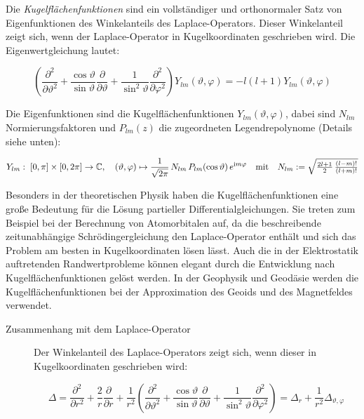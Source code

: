 \begin{definition}
Die \emph{Kugelflächenfunktionen} sind ein vollständiger und orthonormaler Satz von Eigenfunktionen des Winkelanteils des Laplace-Operators. Dieser Winkelanteil zeigt sich, wenn der Laplace-Operator in Kugelkoordinaten geschrieben wird. Die Eigenwertgleichung lautet:

\[\left(\frac{\partial^{2}}{\partial\vartheta^{2}}+\frac{\cos\vartheta}{\sin\vartheta}\frac{\partial}{\partial\vartheta}+\frac{1}{\sin^{2}\vartheta}\frac{\partial^{2}}{\partial\varphi^{2}}\right)Y_{lm}(\vartheta,\varphi)=-l(l+1)Y_{lm}(\vartheta,\varphi)\]

Die Eigenfunktionen sind die Kugelflächenfunktionen $Y_{lm}(\vartheta,\varphi)$, dabei sind $N_{lm}$ Normierungsfaktoren und $P_{lm}(z)$ die zugeordneten Legendrepolynome (Details siehe unten):

\[Y_{lm}:\;\left[0,\pi\right]\times\left[0,2\pi\right]\rightarrow\mathbb{C},\quad(\vartheta,\varphi)\mapsto\frac{1}{\sqrt{2\pi}}\, N_{lm}\, P_{lm}(\cos\vartheta)\, e^{\mathrm im\varphi}\\
\quad \text{mit}\quad N_{lm} := \sqrt{\tfrac{2l+1}{2}\,\tfrac{(l-m)!}{(l+m)!}}\]

Besonders in der theoretischen Physik haben die Kugelflächenfunktionen eine große Bedeutung für die Lösung partieller Differentialgleichungen. Sie treten zum Beispiel bei der Berechnung von Atomorbitalen auf, da die beschreibende zeitunabhängige Schrödingergleichung den Laplace-Operator enthält und sich das Problem am besten in Kugelkoordinaten lösen lässt. Auch die in der Elektrostatik auftretenden Randwertprobleme können elegant durch die Entwicklung nach Kugelflächenfunktionen gelöst werden. In der Geophysik und Geodäsie werden die Kugelflächenfunktionen bei der Approximation des Geoids  und des Magnetfeldes verwendet.

\begin{description}
	\item[Zusammenhang mit dem Laplace-Operator]

Der Winkelanteil des Laplace-Operators zeigt sich, wenn dieser in Kugelkoordinaten geschrieben wird:

\[\Delta=\frac{\partial^{2}}{\partial r^{2}}+\frac{2}{r}\frac{\partial}{\partial r}+\frac{1}{r^{2}}\left(\frac{\partial^{2}}{\partial\vartheta^{2}}+\frac{\cos\vartheta}{\sin\vartheta}\frac{\partial}{\partial\vartheta}+\frac{1}{\sin^{2}\vartheta}\frac{\partial^{2}}{\partial\varphi^{2}}\right)=\Delta_{r}+\frac{1}{r^{2}}\Delta_{\vartheta,\varphi}\]


\end{description}
\end{definition}
